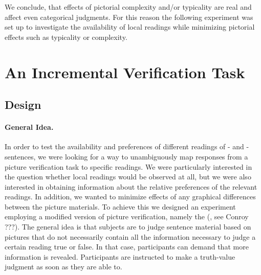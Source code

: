 \documentclass[fleqn,reqno,10pt,draft]{article}
\newcommand{\as}{\acro{as}}
\renewcommand{\es}{\acro{es}}
\begin{document}
We conclude, that  effects of pictorial complexity and/or typicality are real and affect even categorical judgments. For this reason the following experiment was set up to investigate the availability of local readings while minimizing pictorial effects such as typicality or complexity. 




\section{An Incremental Verification Task}
\label{sec:exp}

\subsection{Design}
\label{sec:design}

\paragraph{General Idea.} In order to test the availability and
preferences of different readings of \as- and \es-sentences, we were
looking for a way to unambiguously map responses from a picture
verification task to specific readings. We were particularly
interested in the question whether local readings would be observed at
all, but we were also interested in obtaining information about the
relative preferences of the relevant readings. In addition, we wanted
to minimize effects of any graphical differences between the picture
materials. To achieve this we designed an experiment employing a
modified version of picture verification, namely the
 (, see Conroy
???). The general idea is that subjects are to judge
sentence material based on pictures that do not necessarily contain
all the information necessary to judge a certain reading true or
false. In that case, participants can demand that more information is
revealed. Participants are instructed to make a truth-value judgment
as soon as they are able to.
\end{document}
